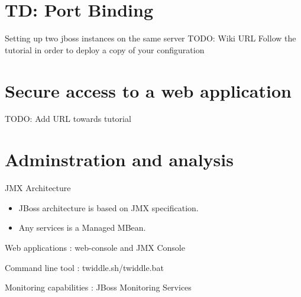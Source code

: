 \documentclass[handout]{beamer}
\begin{document}
\section{TD: Port Binding}
	\begin{frame}
		\begin{block}{Setting up two jboss instances on the same server}
			TODO: Wiki URL
			Follow the tutorial in order to deploy a copy of your configuration
		\end{block}
	\end{frame}


\section{Secure access to a web application}
	\begin{frame}
	 	TODO: Add URL towards tutorial
	\end{frame}

\section{Adminstration and analysis}
	\begin{frame}
		\begin{block}{JMX Architecture}
			\begin{itemize}
			\item JBoss architecture is based on JMX specification.
			\item Any services is a Managed MBean.
			\end{itemize}
		\end{block}
		\begin{Administration tools}
		 	\item Web applications : web-console and JMX Console
			\item Command line tool : twiddle.sh/twiddle.bat
			\item Monitoring capabilities : JBoss Monitoring Services
		\end{Administration tools}
	\end{frame}
\end{document}
